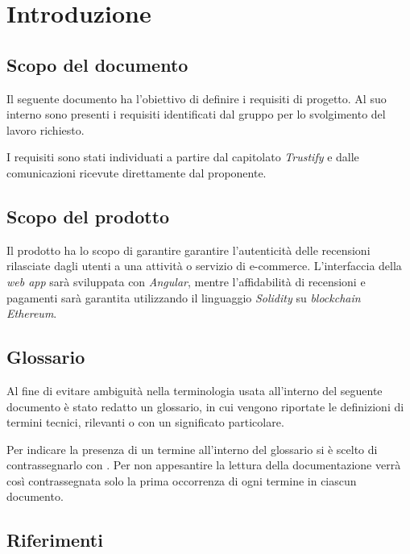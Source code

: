 \section{Introduzione}


\subsection{Scopo del documento}
Il seguente documento ha l'obiettivo di definire i requisiti di progetto. Al suo interno sono presenti i requisiti
identificati dal gruppo \groupName\: per lo svolgimento del lavoro richiesto.

I requisiti sono stati individuati a partire dal capitolato \textit{Trustify}
e dalle comunicazioni ricevute direttamente dal proponente.

\subsection{Scopo del prodotto}
Il prodotto ha lo scopo di garantire garantire l'autenticità
delle recensioni rilasciate dagli utenti a una attività o servizio di e-commerce. L'interfaccia della \textit{web app}\glo\: sarà
sviluppata con \textit{Angular}\glo\:, mentre l'affidabilità di recensioni e pagamenti sarà garantita utilizzando il linguaggio \textit{Solidity}\glo\: su \textit{blockchain}\glo\: \textit{Ethereum}\glo\:.


\subsection{Glossario}
Al fine di evitare ambiguità nella terminologia usata all'interno del seguente
documento è stato redatto un glossario, in cui vengono riportate le definizioni
di termini tecnici, rilevanti o con un significato particolare.

Per indicare
la presenza di un termine all'interno del glossario si è scelto di
contrassegnarlo con \glo. Per non appesantire la lettura della documentazione
verrà così contrassegnata solo la prima occorrenza di ogni termine in ciascun
documento.

\subsection{Riferimenti}
